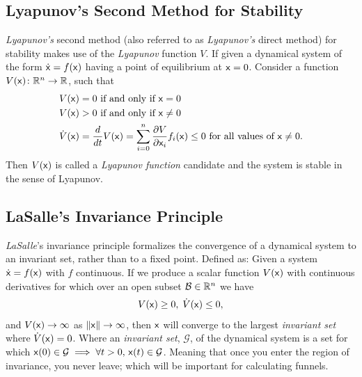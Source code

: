 \subsection{Lyapunov's Second Method for Stability}

\textit{Lyapunov's} second method (also referred to as \textit{Lyapunov's}
direct method) for stability makes use of the \textit{Lyapunov} function \(V\).
If given a dynamical system of the form \(\dot{{\mathbf{\mathsf{x}}}} = f({\mathbf{\mathsf{x}}})\) having
a point of equilibrium at \({\mathbf{\mathsf{x}}} = 0\). Consider a function \(V({\mathbf{\mathsf{x}}})
\colon \mathbb{R}^n \rightarrow \mathbb{R}\), such that
\begin{align*}
  V({\mathbf{\mathsf{x}}}) &= 0 \text{ if and only if } {\mathbf{\mathsf{x}}} = 0 \\
  V({\mathbf{\mathsf{x}}}) &> 0 \text{ if and only if } {\mathbf{\mathsf{x}}} \neq 0 \\
  \dot{V}({\mathbf{\mathsf{x}}}) &= \frac{d}{dt}V({\mathbf{\mathsf{x}}}) = \sum_{i=0}^{n} \frac{\partial V}{\partial {\mathbf{\mathsf{x}}}_i} f_i({\mathbf{\mathsf{x}}}) \leq 0 \text{ for all values of } {\mathbf{\mathsf{x}}} \neq 0. \\
\end{align*}
Then \(V({\mathbf{\mathsf{x}}})\) is called a \textit{Lyapunov function} candidate and the
system is stable in the sense of Lyapunov.

\subsection{LaSalle's Invariance Principle}
\label{subsec:LaSalle's invariance principle}

\textit{LaSalle}'s invariance principle formalizes the convergence of a
dynamical system to an invariant set, rather than to a fixed point. Defined as:
Given a system \(\dot{{\mathbf{\mathsf{x}}}} = f({\mathbf{\mathsf{x}}})\) with \(f\) continuous. If we
produce a scalar function \(V({\mathbf{\mathsf{x}}})\) with continuous derivatives for which
over an open subset \(\mathcal{B} \in \mathbb{R}^n\) we have
\begin{align*}
  V({\mathbf{\mathsf{x}}}) \geq 0, \; \dot{V}({\mathbf{\mathsf{x}}}) \leq 0,
\end{align*}
and \(V({\mathbf{\mathsf{x}}}) \rightarrow \infty\) as \(\lVert{\mathbf{\mathsf{x}}}\rVert \rightarrow
\infty\), then \({\mathbf{\mathsf{x}}}\) will converge to the largest \textit{invariant set}
where \(\dot{V}({\mathbf{\mathsf{x}}}) = 0\). Where an \textit{invariant set},
\(\mathcal{G}\), of the dynamical system is a set for which \({\mathbf{\mathsf{x}}}(0) \in
\mathcal{G} \implies \forall t > 0,\, {\mathbf{\mathsf{x}}}(t) \in \mathcal{G}\). Meaning
that once you enter the region of invariance, you never leave; which will be
important for calculating funnels.

